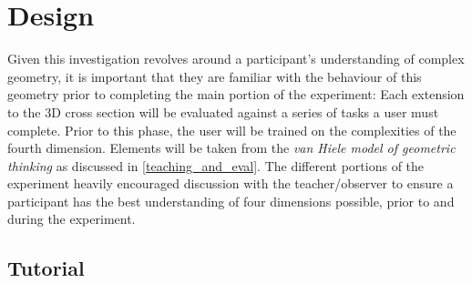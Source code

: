 \documentclass{l4proj}
\begin{document}
\chapter{Design}

Given this investigation revolves around a participant's understanding of complex geometry, it is important that they are familiar with the behaviour of this geometry prior to completing the main portion of the experiment:
Each extension to the 3D cross section will be evaluated against a series of tasks a user must complete. Prior to this phase, the user will be trained on the complexities of the fourth dimension. Elements will be taken from the \textit{van Hiele model of geometric thinking} as discussed in \cref{teaching_and_eval}. 
%
The different portions of the experiment heavily encouraged discussion with the teacher/observer to ensure a participant has the best understanding of four dimensions possible, prior to and during the experiment.

\section{Tutorial}
\label{tutorial}
\end{document}
